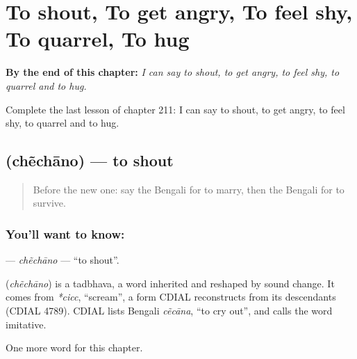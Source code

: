 
\chapter{To shout, To get angry, To feel shy, To quarrel, To hug}
\label{ch:bn-to-shout-to-get-angry-to-feel-shy-to-quarrel-to-hug}

\begin{chapteropening}
\textbf{By the end of this chapter:} \emph{I can say to shout, to get angry, to feel shy, to quarrel and to hug.}

Complete the last lesson of chapter 211: I can say to shout, to get angry, to feel shy, to quarrel and to hug.
\end{chapteropening}

\section[\texorpdfstring{\bn{চেঁচানো} (chẽchāno)}{চেঁচানো (chẽchāno)}]{ (chẽchāno) — to shout}

\label{lesson:BN-C211-chechano}



\begin{quote}
Before the new one: say the Bengali for to marry, then the Bengali for to survive.
\end{quote}

\subsection*{You'll want to know: }
\textbf{} — \emph{chẽchāno} — \textquotedblleft{}to shout\textquotedblright{}.

\begin{cousinweb}
\textbf{} (\emph{chẽchāno}) is a tadbhava, a word inherited and reshaped by sound change. It comes from \emph{*cicc}, \textquotedblleft{}scream\textquotedblright{}, a form CDIAL reconstructs from its descendants (CDIAL 4789). CDIAL lists Bengali \emph{cẽcāna}, \textquotedblleft{}to cry out\textquotedblright{}, and calls the word imitative.
\end{cousinweb}

\begin{grammarlens}[title={What you've built}]
One more word for this chapter.
\end{grammarlens}

